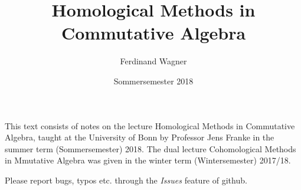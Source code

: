 \documentclass[a4paper,parskip=half,numbers=enddot, DIV=12]{scrreprt}
\title{Homological Methods in Commutative Algebra}
\author{Ferdinand Wagner}
\date{Sommersemester 2018}
\begin{document}
\maketitle
{}

\thispagestyle{plain}
This text consists of notes on the lecture Homological Methods in Commutative Algebra, taught at the University of Bonn by Professor Jens Franke in the summer term (Sommersemester) 2018. The dual lecture Cohomological Methods in Mmutative Algebra was given in the winter term (Wintersemester) 2017/18.

Please report bugs, typos etc. through the \emph{Issues} feature of github.

\tableofcontents

\end{document}
